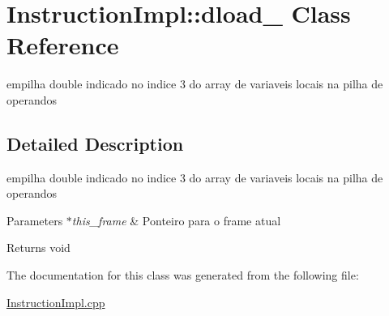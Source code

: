 \hypertarget{class_instruction_impl_1_1dload__3}{}\section{Instruction\+Impl\+:\+:dload\+\_ Class Reference}
\label{class_instruction_impl_1_1dload__3}


empilha double indicado no indice 3 do array de variaveis locais na pilha de operandos  




\subsection{Detailed Description}
empilha double indicado no indice 3 do array de variaveis locais na pilha de operandos 


\begin{DoxyParams}{Parameters}
{\em $\ast$this\+\_\+frame} & Ponteiro para o frame atual \\
\hline
\end{DoxyParams}
\begin{DoxyReturn}{Returns}
void 
\end{DoxyReturn}


The documentation for this class was generated from the following file\+:\begin{DoxyCompactItemize}
\item 
\hyperlink{_instruction_impl_8cpp}{Instruction\+Impl.\+cpp}\end{DoxyCompactItemize}
